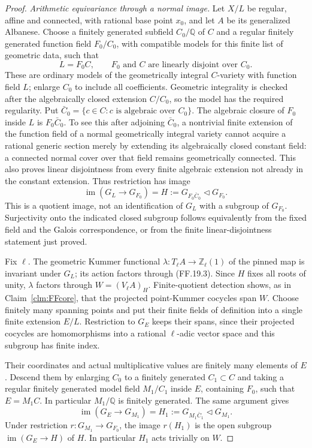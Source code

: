 \begin{proof}
\emph{Arithmetic equivariance through a normal image.}
Let \(X/L\) be regular, affine and connected, with rational
base point \(x_0\), and let \(A\) be its generalized Albanese.
Choose a finitely generated subfield \(C_0/\mathbb Q\) of
\(C\) and a regular finitely generated function field
\(F_0/C_0\), with compatible models for this finite list of
geometric data, such that
\[
 L=F_0C,\qquad F_0\text{ and }C\text{ are linearly disjoint
 over }C_0.                                                \tag{FF.19.2}
\]
These are ordinary models of the geometrically integral
\(C\)-variety with function field \(L\); enlarge \(C_0\)
to include all coefficients. Geometric integrality is checked
after the algebraically closed extension \(C/C_0\), so the
model has the required regularity. Put
\(\bar C_0=\{c\in C:c\text{ is algebraic over }C_0\}\).
The algebraic closure of \(F_0\) inside \(L\) is
\(F_0\bar C_0\). To see this after adjoining \(\bar C_0\),
a nontrivial finite extension of the function field of a normal
geometrically integral variety cannot acquire a rational generic
section merely by extending its algebraically closed constant
field: a connected normal cover over that field remains
geometrically connected. This also proves linear disjointness
from every finite algebraic extension not already in the constant
extension. Thus restriction has image
\[
 \operatorname{im}(G_L\longrightarrow G_{F_0})
           =H:=G_{F_0\bar C_0}\triangleleft G_{F_0}.       \tag{FF.19.3}
\]
This is a quotient image, not an identification of \(G_L\)
with a subgroup of \(G_{F_0}\). Surjectivity onto the indicated
closed subgroup follows equivalently from the fixed field and
the Galois correspondence, or from the finite linear-disjointness
statement just proved.

Fix \(\ell\). The geometric Kummer functional
\(\lambda:T_\ell A\to\mathbb Z_\ell(1)\) of the pinned map
is invariant under \(G_L\); its action factors through (FF.19.3).
Since \(H\) fixes all roots of unity, \(\lambda\) factors
through \(W=(V_\ell A)_H\). Finite-quotient detection shows,
as in Claim~\ref{clm:FFcore}, that the projected point-Kummer
cocycles span \(W\). Choose finitely many spanning points and
put their finite fields of definition into a single finite
extension \(E/L\). Restriction to \(G_E\) keeps their spans,
since their projected cocycles are homomorphisms into a rational
\(\ell\)-adic vector space and this subgroup has finite index.

Their coordinates and actual multiplicative values are finitely
many elements of \(E\). Descend them by enlarging \(C_0\)
to a finitely generated \(C_1\subset C\) and taking a
regular finitely generated model field \(M_1/C_1\) inside
\(E\), containing \(F_0\), such that
\(E=M_1C\). In particular \(M_1/\mathbb Q\) is finitely
 generated. The same argument gives
\[
 \operatorname{im}(G_E\to G_{M_1})
       =H_1:=G_{M_1\bar C_1}\triangleleft G_{M_1}.         \tag{FF.19.4}
\]
Under restriction \(r:G_{M_1}\to G_{F_0}\), the image
\(r(H_1)\) is the open subgroup
\(\operatorname{im}(G_E\to H)\) of \(H\).
In particular \(H_1\) acts trivially on \(W\).


\end{proof}
